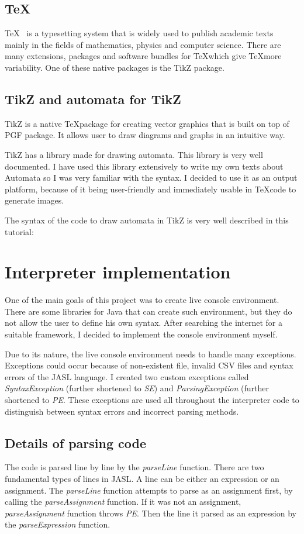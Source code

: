 \documentclass{ctuthesis}
\begin{document}
\subsection{\TeX}
\TeX~\cite{tex} is a typesetting system that is widely used to publish academic texts mainly in the fields of mathematics, physics and computer science. There are many extensions, packages and software bundles for \TeX which give \TeX more variability. One of these native packages is the TikZ package.

\subsection{TikZ and automata for TikZ}
TikZ is a native \TeX package for creating vector graphics that is built on top of PGF package. It allows user to draw diagrams and graphs in an intuitive way.

TikZ has a library made for drawing automata. This library is very well documented. I have used this library extensively to write my own texts about Automata so I was very familiar with the syntax. I decided to use it as an output platform, because of it being user-friendly and immediately usable in \TeX code to generate images.

The syntax of the code to draw automata in TikZ is very well described in this tutorial:~\cite{tikz-tut}

\section{Interpreter implementation}
One of the main goals of this project was to create live console environment. There are some libraries for Java that can create such environment, but they do not allow the user to define his own syntax. After searching the internet for a suitable framework, I decided to implement the console environment myself. 

Due to its nature, the live console environment needs to handle many exceptions. Exceptions could occur because of non-existent file, invalid CSV files and syntax errors of the JASL language. I created two custom exceptions called \textit{SyntaxException} (further shortened to \textit{SE}) and \textit{ParsingException} (further shortened to \textit{PE}. These exceptions are used all throughout the interpreter code to distinguish between syntax errors and incorrect parsing methods.

\subsection{Details of parsing code}
The code is parsed line by line by the \textit{parseLine} function. There are two fundamental types of lines in JASL. A line can be either an expression or an assignment. The \textit{parseLine} function attempts to parse as an assignment first, by calling the \textit{parseAssignment} function. If it was not an assignment, \textit{parseAssignment} function throws \textit{PE}. Then the line it parsed as an expression by the \textit{parseExpression} function.
\end{document}
